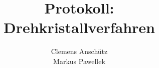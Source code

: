 

\title{Protokoll: \\ Drehkristallverfahren}
\author{Clemens Anschütz \\ Markus Pawellek}

\usepackage[font=footnotesize]{subcaption}
\usepackage{placeins}


	
	\articletitle
	\tableofcontents
	\newpage
	\thispagestyle{empty}
	\null
	\newpage

	
	\FloatBarrier
	\null
	\newpage
	
	\FloatBarrier
	\null
	\newpage
	
	\FloatBarrier
	\null
	\newpage
	
	\FloatBarrier
	\null
	\newpage
	
	\FloatBarrier
	\null
	\newpage
	\appendix
	

